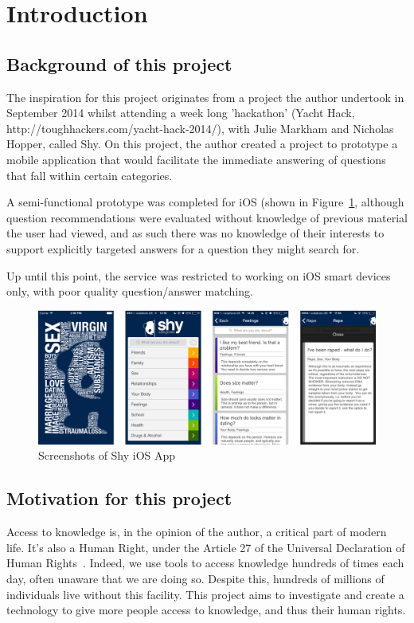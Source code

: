 \documentclass{article}
\begin{document}
\section{Introduction}

\subsection{Background of this project}

The inspiration for this project originates from a project the author undertook in September 2014 whilst attending a week long 'hackathon' (Yacht Hack, http://toughhackers.com/yacht-hack-2014/), with Julie Markham and Nicholas Hopper, called Shy.  On this project, the author created a project to prototype a mobile application that would facilitate the immediate answering of questions that fall within certain categories.

A semi-functional prototype was completed for iOS (shown in Figure~\ref{fig:shy-ios-screenshots}, although question recommendations were evaluated without knowledge of previous material the user had viewed, and as such there was no knowledge of their interests to support explicitly targeted answers for a question they might search for.

Up until this point, the service was restricted to working on iOS smart devices only, with poor quality question/answer matching.

\begin{figure}[htb] 
\includegraphics[width=\linewidth]{shy-screenshots}
\caption{Screenshots of Shy iOS App}
\label{fig:shy-ios-screenshots}
\end{figure}

\subsection{Motivation for this project}
Access to knowledge is, in the opinion of the author, a critical part of modern life.  It's also a Human Right, under the Article 27 of the Universal Declaration of Human Rights~\cite{community1948universal}.  Indeed, we use tools to access knowledge hundreds of times each day, often unaware that we are doing so.  Despite this, hundreds of millions of individuals live without this facility.  This project aims to investigate and create a technology to give more people access to knowledge, and thus their human rights.
\end{document}
